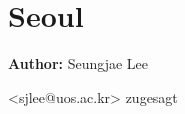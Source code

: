 \section{Seoul}
\label{ch:scenarios:seoul}
\hfill \textbf{Author:} Seungjae Lee

<sjlee@uos.ac.kr> zugesagt

